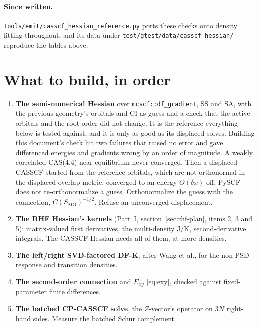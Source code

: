 \documentclass[11pt]{article}
\newcommand{\code}[1]{\texttt{#1}}
\begin{document}
\paragraph{Since written.} \code{tools/emit/casscf\_hessian\_reference.py}
ports these checks onto density fitting throughout, and its data under
\code{test/gtest/data/casscf\_hessian/} reproduce the tables above.

\section{What to build, in order}
\label{sec:plan}

\begin{enumerate}
  \item \textbf{The semi-numerical Hessian} over \code{mcscf::df\_gradient},
        SS and SA, with the previous geometry's orbitals and CI as guess
        and a check that the active orbitals and the root order did not
        change. It is the reference everything below is tested against,
        and it is only as good as its displaced solves. Building this
        document's check hit two failures that raised no error and gave
        differenced energies and gradients wrong by an order of magnitude.
        A weakly correlated CAS(4,4) near equilibrium never converged.
        Then a displaced CASSCF started from the reference orbitals, which
        are not orthonormal in the displaced overlap metric, converged to an
        energy $O(\delta x)$ off: PySCF does not re-orthonormalize a guess.
        Orthonormalize the guess with the connection, $C(S_{\mathrm{MO}})^{-1/2}$.
        Refuse an unconverged
        displacement.
  \item \textbf{The RHF Hessian's kernels} (Part~I,
        section~\ref{sec:rhf-plan}, items 2, 3 and 5): matrix-valued first
        derivatives, the multi-density J/K, second-derivative integrals.
        The CASSCF Hessian needs all of them, at more densities.
  \item \textbf{The left/right SVD-factored DF-K}, after Wang et al., for
        the non-PSD response and transition densities.
  \item \textbf{The second-order connection} and $E_{xy}$ \eqref{eq:exy},
        checked against fixed-parameter finite differences.
  \item \textbf{The batched CP-CASSCF solve}, the $Z$-vector's operator on
        $3N$ right-hand sides. Measure the batched Schur complement

\end{enumerate}
\end{document}
